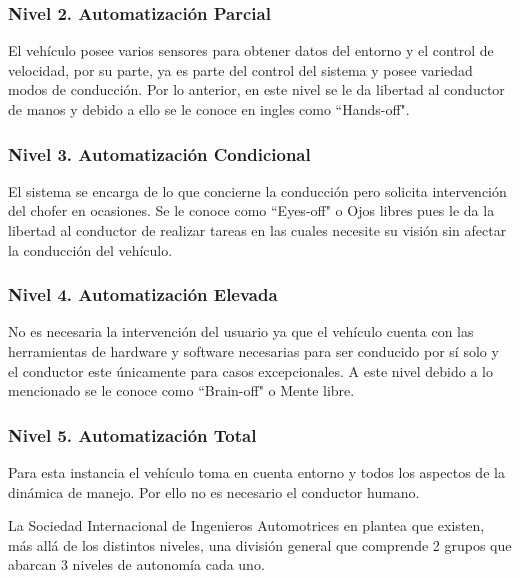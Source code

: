 \subsubsection{Nivel 2. Automatización Parcial}
\begin{myindentpar}{5cm}
{El vehículo posee varios sensores para obtener datos del entorno y el control de velocidad, por su parte, ya es parte del control del sistema y posee variedad modos de conducción. Por lo anterior, en este nivel se le da libertad al conductor de manos y debido a ello se le conoce en ingles como ``Hands-off".}
\end{myindentpar}

\subsubsection{Nivel 3. Automatización Condicional}
\begin{myindentpar}{5cm}
{El sistema se encarga de lo que concierne la conducción pero solicita intervención del chofer en ocasiones. Se le conoce como ``Eyes-off" o Ojos libres pues le da la libertad al conductor de realizar tareas en las cuales necesite su visión sin afectar la conducción del vehículo. }
\end{myindentpar}

\subsubsection{Nivel 4. Automatización Elevada}
\begin{myindentpar}{5cm}
{No es necesaria la intervención del usuario ya que el vehículo cuenta con las herramientas de hardware y software necesarias para ser conducido por sí solo y el conductor este únicamente para casos excepcionales. A este nivel debido a lo mencionado se le conoce como ``Brain-off" o Mente libre.}
\end{myindentpar}

\subsubsection{Nivel 5. Automatización Total}
\begin{myindentpar}{5cm}
{Para esta instancia el vehículo toma en cuenta entorno y todos los aspectos de la dinámica de manejo. Por ello no es necesario el conductor humano.}
\end{myindentpar}

La Sociedad Internacional de Ingenieros Automotrices en \cite{SAE2016} plantea que existen, más allá de los distintos niveles, una división general que comprende 2 grupos que abarcan 3 niveles de autonomía cada uno. 

